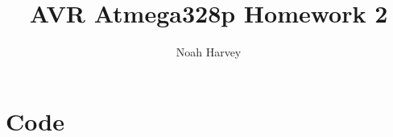 \documentclass{report}
\begin{document}
\title{AVR Atmega328p Homework 2}
\author{Noah Harvey}
\maketitle
\chapter*{Code}

\end{document}
